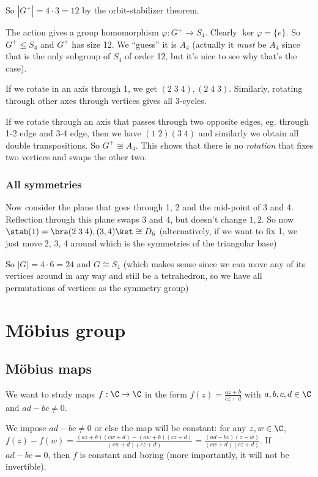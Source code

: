 \documentclass[a4paper]{article}
\begin{document}
So $|G^+| = 4\cdot 3 = 12$ by the orbit-stabilizer theorem.

The action gives a group homomorphism $\varphi: G^+ \to S_4$. Clearly $\ker \varphi = \{e\}$. So $G^+ \leq S_4$ and $G^+$ has size 12. We ``guess'' it is $A_4$ (actually it \emph{must} be $A_4$ since that is the only subgroup of $S_4$ of order 12, but it's nice to see why that's the case).

If we rotate in an axis through 1, we get $(2\; 3\; 4), (2\; 4\; 3)$. Similarly, rotating through other axes through vertices gives all 3-cycles.

If we rotate through an axis that passes through two opposite edges, eg. through 1-2 edge and 3-4 edge, then we have $(1\; 2)(3\; 4)$ and similarly we obtain all double transpositions. So $G^+ \cong A_4$. This shows that there is no \emph{rotation} that fixes two vertices and swaps the other two.

\subsubsection*{All symmetries}
Now consider the plane that goes through 1, 2 and the mid-point of 3 and 4. Reflection through this plane swaps 3 and 4, but doesn't change $1, 2$. So now $\stab(1) = \bra (2\; 3\; 4), (3, 4)\ket \cong D_6$ (alternatively, if we want to fix 1, we just move 2, 3, 4 around which is the symmetries of the triangular base)

So $|G| = 4\cdot 6 = 24$ and $G\cong S_4$ (which makes sense since we can move any of its vertices around in any way and still be a tetrahedron, so we have all permutations of vertices as the symmetry group)

\section{M\"obius group}
\subsection{M\"obius maps}
We want to study maps $f: \C \to \C$ in the form $f(z) = \frac{az + b}{cz + d}$ with $a, b, c, d\in \C$ and $ad - bc \not= 0$.

We impose $ad - bc\not= 0$ or else the map will be constant: for any $z, w\in \C$, $f(z) - f(w) = \frac{(az + b)(cw + d) - (aw + b)(cz + d)}{(cw + d)(cz + d)} = \frac{(ad - bc)(z - w)}{(cw + d)(cz + d)}$. If $ad - bc = 0$, then $f$ is constant and boring (more importantly, it will not be invertible).
\end{document}
